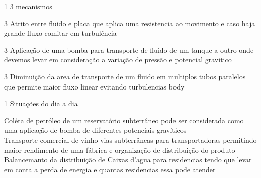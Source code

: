 \documentclass[\mainfilename]{subfiles}
\begin{document}

\begin{questionBox}1{ %
    3 mecanismos
} %
    
    \begin{questionBox}3{ %
    } %
        Atrito entre fluido e placa que aplica uma resistencia ao movimento e caso haja grande fluxo comitar em turbulência
    \end{questionBox}
    
    \begin{questionBox}3{ %
    } %
        Aplicação de uma bomba para transporte de fluido de um tanque a outro onde devemos levar em consideração a variação de pressão e potencial gravitico
    \end{questionBox}

    \begin{questionBox}3{ %
        Diminuição da area de transporte de um fluido em multiplos tubos paralelos que permite maior fluxo linear evitando turbulencias
    } %
        body
    \end{questionBox}

\end{questionBox}

\begin{questionBox}1{ %
    Situações do dia a dia
} %
    
    Coléta de petróleo de um reservatório subterrâneo pode ser considerada como uma aplicação de bomba de diferentes potenciais gravíticos\\
    
    Transporte comercial de vinho-vias subterrâneas para transportadoras permitindo maior rendimento de uma fábrica e organização de distribuição do produto\\

    Balancemanto da distribuição de Caixas d'agua para residencias tendo que levar em conta a perda de energia e quantas residencias essa pode atender

\end{questionBox}
\end{document}
